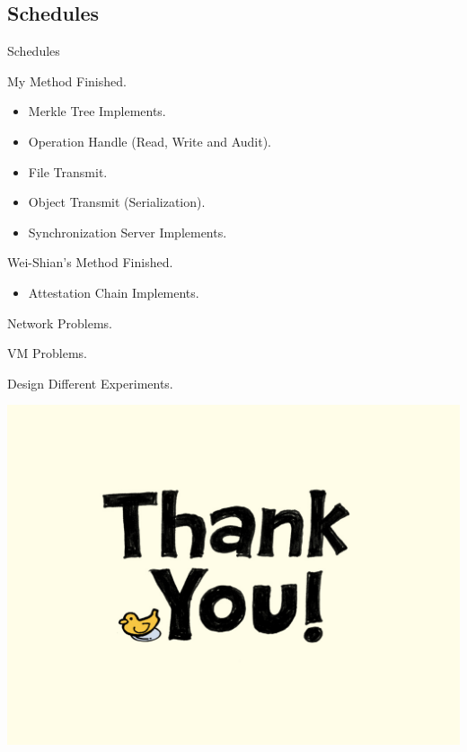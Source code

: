 \documentclass{beamer}
\begin{document}
\begin{CJK}{UTF8}{bkai}
\section{Schedules}
\begin{frame}{Schedules}
	\begin{enumerate}
	{\color{blue}
	\item My Method Finished.
		\begin{itemize}
			\item Merkle Tree Implements.
			\item Operation Handle (Read, Write and Audit).
			\item File Transmit.
			\item Object Transmit (Serialization).
			\item Synchronization Server Implements.
		\end{itemize}
	\item Wei-Shian's Method Finished.}
		\begin{itemize}
			\item Attestation Chain Implements.
		\end{itemize}
	\item \alert{Network Problems.}
	\item \alert{VM Problems.}
	\item Design Different Experiments.
	\end{enumerate}
\end{frame}

\begin{frame}
	\begin{center}
	\includegraphics[width=\textwidth]{thank_you.jpg}
	\end{center}	
\end{frame}
\end{CJK}
\end{document}
